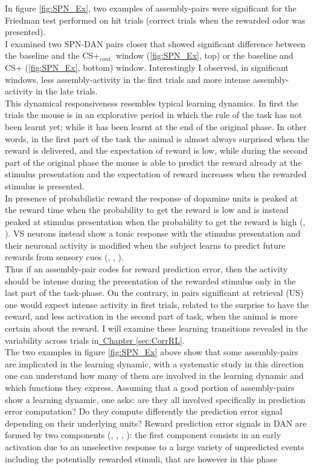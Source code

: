 In figure \ref{fig:SPN_Ex}, two examples of assembly-pairs were significant for the Friedman test performed on hit trials (correct trials when the rewarded odor was presented).\\I examined two SPN-DAN pairs closer that showed significant difference between the baseline and the CS+$_{cont.}$ window (\ref{fig:SPN_Ex}, top) or the baseline and CS+ (\ref{fig:SPN_Ex}, bottom) window. Interestingly I observed, in significant windows, less assembly-activity in the first trials and more intense assembly-activity in the late trials.\\This dynamical responsiveness resembles typical learning dynamics. In first the trials the mouse is in an explorative period in which the rule of the task has not been learnt yet; while it has been learnt at the end of the original phase. In other words, in the first part of the task the animal is almost always surprised when the reward is delivered, and the expectation of reward is low, while during the second part of the original phase the mouse is able to predict the reward already at the stimulus presentation and the expectation of reward increases when the rewarded stimulus is presented.\\In presence of probabilistic reward the response of dopamine units is peaked at the reward time when the probability to get the reward is low and is instead peaked at stimulus presentation when the probability to get the reward is high (\cite{Schultz1992}, \cite{Schultz} \cite{Fiorillo}). VS neurons instead show a tonic response with the stimulus presentation and their neuronal activity is modified when the subject learns to predict future rewards from sensory cues (\cite{Pagnoni}, \cite{Schultz2000}, \cite{Radua}).\\Thus if an assembly-pair codes for reward prediction error, then the activity should be intense during the presentation of the rewarded stimulus only in the last part of the task-phase. On the contrary, in pairs significant at retrieval (US) one would expect intense activity in first trials, related to the surprise to have the reward, and less activation in the second part of task, when the animal is more certain about the reward. I will examine these learning transitions revealed in the variability across trials in\hyperref[sec:CorrRL]{~Chapter \ref*{sec:CorrRL}}.\\The two examples in figure \ref{fig:SPN_Ex} above show that some assembly-pairs are implicated in the learning dynamic, with a systematic study in this direction one can understand how many of them are involved in the learning dynamic and which functions they express. Assuming that a good portion of assembly-pairs show a learning dynamic, one asks: are they all involved specifically in prediction error computation? Do they compute differently the prediction error signal depending on their underlying units? Reward prediction error signals in DAN are formed by two components (\cite{Tobler2003}, \cite{Nomoto2010}, \cite{Fiorillo2013}, \cite{Schultz2016}): the first component consists in an early activation due to an unselective response to a large variety of unpredicted events including the potentially rewarded stimuli, that are however in this phase 
